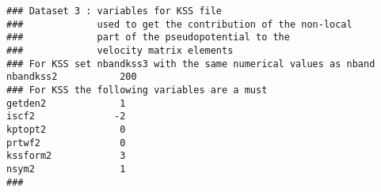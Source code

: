 \documentclass[letterpaper,10pt]{article}
\begin{document}
\begin{verbatim}
### Dataset 3 : variables for KSS file
###             used to get the contribution of the non-local
###             part of the pseudopotential to the 
###             velocity matrix elements
### For KSS set nbandkss3 with the same numerical values as nband
nbandkss2           200
### For KSS the following variables are a must
getden2             1
iscf2              -2
kptopt2             0
prtwf2              0
kssform2            3
nsym2               1 
###
\end{verbatim}
\end{document}
